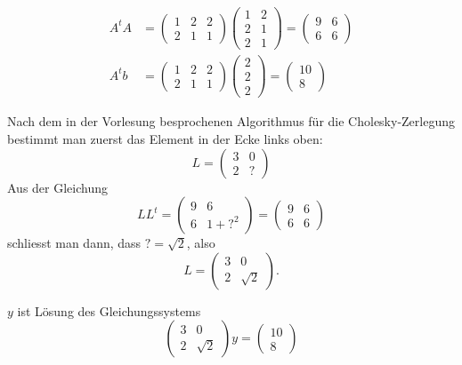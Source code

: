 \begin{loesung}
\begin{teilaufgaben}
\item
\begin{align*}
A^tA&=
\begin{pmatrix}1&2&2\\2&1&1\end{pmatrix}
\begin{pmatrix}1&2\\2&1\\2&1\end{pmatrix}
=
\begin{pmatrix}
9&6\\
6&6
\end{pmatrix}
\\
A^tb&=
\begin{pmatrix}1&2&2\\2&1&1\end{pmatrix}
\begin{pmatrix}2\\2\\2\end{pmatrix}
=
\begin{pmatrix}
10\\8
\end{pmatrix}
\end{align*}
\item Nach dem in der Vorlesung besprochenen Algorithmus für die
Cholesky-Zerlegung bestimmt man zuerst das Element in der Ecke
links oben:
\[
L=\begin{pmatrix}
3&0\\
2&?
\end{pmatrix}
\]
Aus der Gleichung
\[
LL^t=\begin{pmatrix}9&6\\6&1+?^2\end{pmatrix}=\begin{pmatrix}9&6\\6&6\end{pmatrix}
\]
schliesst man dann, dass $?=\sqrt{2}$, also
\[
L=\begin{pmatrix}
3&0\\2&\sqrt{2}
\end{pmatrix}.
\]
\item $y$ ist Lösung des Gleichungssystems
\[
\begin{pmatrix}
3&0\\
2&\sqrt{2}
\end{pmatrix}y=\begin{pmatrix}10\\8\end{pmatrix}
\]
\end{teilaufgaben}
\end{loesung}
